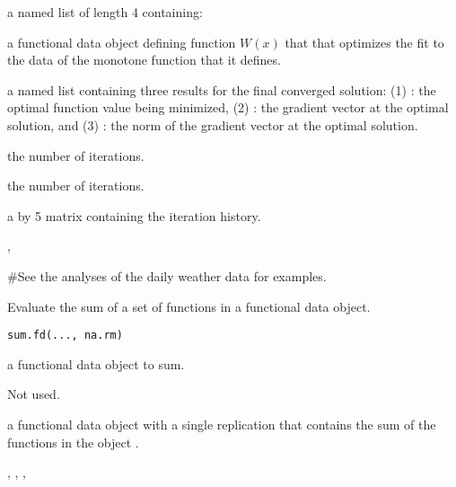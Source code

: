 \documentclass{article}
\begin{document}
\begin{Value}
a named list of length 4 containing:

\begin{ldescription}
\item[\code{Wfdobj}] a functional data object defining function $W(x)$ that that
optimizes the fit to the data of the monotone function that it defines.

\item[\code{Flist}] a named list containing three results for the final converged solution:
(1)
: the optimal function value being minimized,
(2)
: the gradient vector at the optimal solution,   and
(3)
: the norm of the gradient vector at the optimal solution.

\item[\code{iternum}] the number of iterations.

\item[\code{iternum}] the number of iterations.

\item[\code{iterhist}] a  by 5 matrix containing the iteration
history.

\end{ldescription}
\end{Value}
\begin{SeeAlso}\relax
{}, 
\end{SeeAlso}
\begin{Examples}
\begin{ExampleCode}
#See the analyses of the daily weather data for examples.
\end{ExampleCode}
\end{Examples}

\begin{Description}\relax
Evaluate the sum of a set of functions in a functional data object.
\end{Description}
\begin{Usage}
\begin{verbatim}
sum.fd(..., na.rm)
\end{verbatim}
\end{Usage}
\begin{Arguments}
\begin{ldescription}
\item[\code{...}] a functional data object to sum.

\item[\code{na.rm}] Not used.
\end{ldescription}
\end{Arguments}
\begin{Value}
a functional data object with a single replication
that contains the sum of the functions in the object .
\end{Value}
\begin{SeeAlso}\relax
{}, 
, 
, 
\end{SeeAlso}
\end{document}
